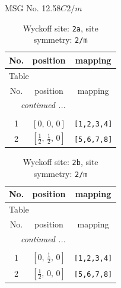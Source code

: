 \documentclass[fleqn,8pt]{jsarticle}
\begin{document}
\setcounter{MaxMatrixCols}{32}

\renewcommand{\tablename}{Table~}
\renewcommand{\figurename}{Figure~}
\begin{center}
\LARGE
MSG No. 12.58\quad$C2/m$
\end{center}
\renewcommand{\arraystretch}{1.2}
\begin{longtable}{ccc}
\caption{Wyckoff site: {\tt 2a}, site symmetry: {\tt 2/m}}
 \\
 \hline \hline
No. & position & mapping \\ \hline \endfirsthead

\multicolumn{2}{l}{\tablename\ \thetable{}} \\
 \hline \hline
No. & position & mapping \\ \hline \endhead

 \hline \hline
\multicolumn{2}{r}{\footnotesize\it continued ...} \\ \endfoot

 \hline \hline
\multicolumn{2}{r}{} \\ \endlastfoot

1 & $\left[ 0,\, 0,\, 0 \right]$ & {\tt [1,2,3,4]} \\ \hline
2 & $\left[ \frac{1}{2},\, \frac{1}{2},\, 0 \right]$ & {\tt [5,6,7,8]} \\
\end{longtable}
\renewcommand{\arraystretch}{1.2}
\begin{longtable}{ccc}
\caption{Wyckoff site: {\tt 2b}, site symmetry: {\tt 2/m}}
 \\
 \hline \hline
No. & position & mapping \\ \hline \endfirsthead

\multicolumn{2}{l}{\tablename\ \thetable{}} \\
 \hline \hline
No. & position & mapping \\ \hline \endhead

 \hline \hline
\multicolumn{2}{r}{\footnotesize\it continued ...} \\ \endfoot

 \hline \hline
\multicolumn{2}{r}{} \\ \endlastfoot

1 & $\left[ 0,\, \frac{1}{2},\, 0 \right]$ & {\tt [1,2,3,4]} \\ \hline
2 & $\left[ \frac{1}{2},\, 0,\, 0 \right]$ & {\tt [5,6,7,8]} \\
\end{longtable}
\renewcommand{\arraystretch}{1.2}
\end{document}
